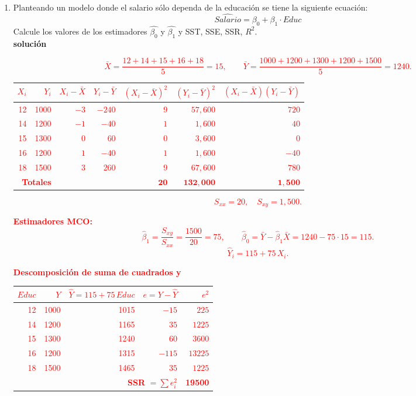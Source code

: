 \documentclass[10pt,a4paper]{article}
\begin{document}
\begin{enumerate}
    \item Planteando un modelo donde el salario sólo dependa de la educación se tiene la siguiente ecuación:
    $$\widehat{Salario} = \beta_0 + \beta_1 \cdot Educ$$
    Calcule los valores de los estimadores $\hat{\beta_0}$ y $\hat{\beta_1}$ y SST, SSE, SSR, $R^2$.
    \\
    
    \textbf{solución}


\textcolor{red}{

\[
\bar X=\frac{12+14+15+16+18}{5}=15,\qquad
\bar Y=\frac{1000+1200+1300+1200+1500}{5}=1240.
\]

\begin{center}
\begin{tabular}{|r|r|r|r|r|r|r|}
\hline
$X_i$ & $Y_i$ & $X_i-\bar X$ & $Y_i-\bar Y$ & $(X_i-\bar X)^2$ & $(Y_i-\bar Y)^2$ & $(X_i-\bar X)(Y_i-\bar Y)$\\ \hline
12 & 1000 & $-3$ & $-240$ & $9$  & $57{,}600$ & $720$ \\
14 & 1200 & $-1$ & $-40$  & $1$  & $1{,}600$  & $40$  \\
15 & 1300 & $0$  & $60$   & $0$  & $3{,}600$  & $0$   \\
16 & 1200 & $1$  & $-40$  & $1$  & $1{,}600$  & $-40$ \\
18 & 1500 & $3$  & $260$  & $9$  & $67{,}600$ & $780$ \\ \hline
\multicolumn{2}{|r|}{\textbf{Totales}} & & & $\mathbf{20}$ & $\mathbf{132{,}000}$ & $\mathbf{1{,}500}$\\ \hline
\end{tabular}
\end{center}

\[
S_{xx}=20,\quad S_{xy}=1{,}500.
\]


\textbf{Estimadores MCO:}
\[
\hat\beta_1=\frac{S_{xy}}{S_{xx}}=\frac{1500}{20}=75,\qquad
\hat\beta_0=\bar Y-\hat\beta_1\bar X=1240-75\cdot 15=115.
\]
\[
\widehat{Y}_i=115+75\,X_i.
\]

\textbf{Descomposición de suma de cuadrados y } 

\begin{center}
\begin{tabular}{|r|r|r|r|r|}
\hline
$Educ$ & $Y$ & $\widehat{Y}=115+75\,Educ$ & $e=Y-\widehat{Y}$ & $e^{2}$ \\ \hline
12 & 1000 & 1015 & $-15$  & $225$ \\
14 & 1200 & 1165 & $35$   & $1225$ \\
15 & 1300 & 1240 & $60$   & $3600$ \\
16 & 1200 & 1315 & $-115$ & $13225$ \\
18 & 1500 & 1465 & $35$   & $1225$ \\ \hline
\multicolumn{4}{|r|}{\textbf{SSR} $=\sum e_i^2$} & \textbf{19500} \\ \hline
\end{tabular}
\end{center}



}
\end{enumerate}
\end{document}
